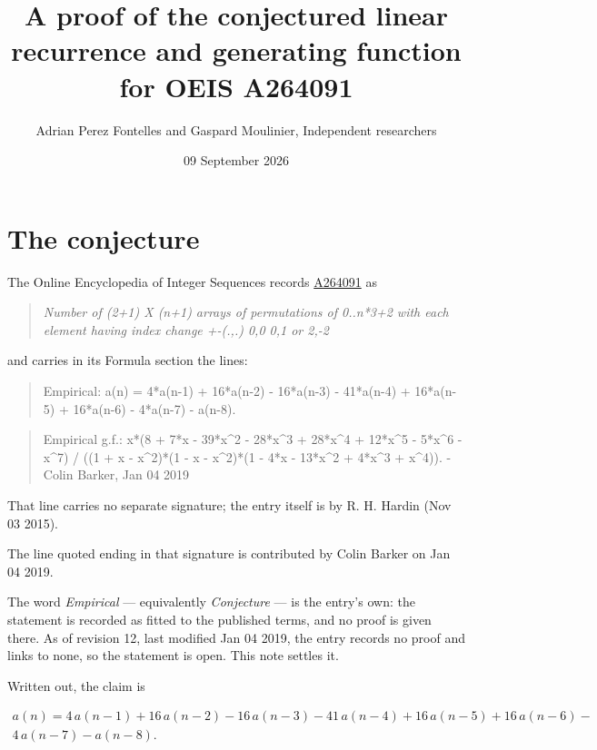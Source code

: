 \documentclass[11pt]{article}
\title{A proof of the conjectured linear recurrence and generating function for OEIS A264091}
\author{Adrian Perez Fontelles and Gaspard Moulinier, Independent researchers}
\date{09 September 2026}
\theoremstyle{definition}
\begin{document}
\maketitle
\section{The conjecture}

The Online Encyclopedia of Integer Sequences records \href{https://oeis.org/A264091}{A264091} as

\begin{quote}\itshape Number of (2+1) X (n+1) arrays of permutations of 0..n*3+2 with each element having index change +-(.,.) 0,0 0,1 or 2,-2\end{quote}

and carries in its Formula section the lines:

\begin{quote}\ttfamily Empirical: a(n) = 4*a(n-1) + 16*a(n-2) - 16*a(n-3) - 41*a(n-4) + 16*a(n-5) + 16*a(n-6) - 4*a(n-7) - a(n-8).\end{quote}

\begin{quote}\ttfamily Empirical g.f.: x*(8 + 7*x - 39*x\textasciicircum{}2 - 28*x\textasciicircum{}3 + 28*x\textasciicircum{}4 + 12*x\textasciicircum{}5 - 5*x\textasciicircum{}6 - x\textasciicircum{}7) / ((1 + x - x\textasciicircum{}2)*(1 - x - x\textasciicircum{}2)*(1 - 4*x - 13*x\textasciicircum{}2 + 4*x\textasciicircum{}3 + x\textasciicircum{}4)). - Colin Barker, Jan 04 2019\end{quote}

That line carries no separate signature; the entry itself is by R. H. Hardin (Nov 03 2015).

The line quoted ending in that signature is contributed by Colin Barker on Jan 04 2019.

The word {\itshape Empirical} --- equivalently {\itshape Conjecture} --- is the entry's own: the statement is recorded as fitted to the published terms, and no proof is given there. As of revision 12, last modified Jan 04 2019, the entry records no proof and links to none, so the statement is open. This note settles it.

Written out, the claim is

\begin{multline*} a(n) = 4\,a(n-1) + 16\,a(n-2) - 16\,a(n-3) - 41\,a(n-4) + 16\,a(n-5) + 16\,a(n-6) - \\ 4\,a(n-7) - a(n-8). \end{multline*}
\end{document}
